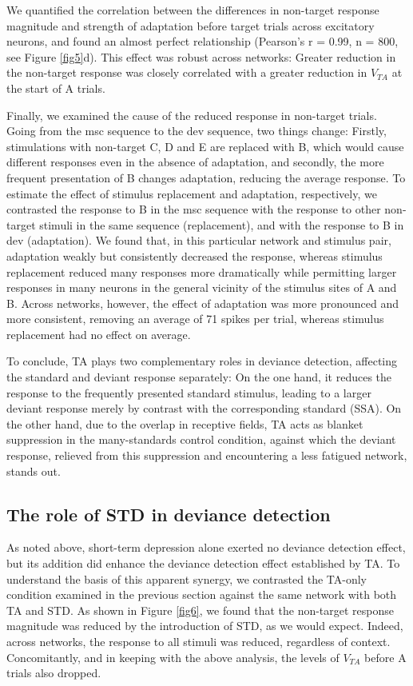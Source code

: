 \documentclass[pdflatex,referee,iicol,sn-basic]{sn-jnl}
\theoremstyle{thmstyleone}%
\theoremstyle{thmstyletwo}%
\theoremstyle{thmstylethree}%
\begin{document}
We quantified the correlation between the differences in non-target response magnitude and strength of adaptation before target trials across excitatory neurons, and found an almost perfect relationship (Pearson's r = 0.99, n = 800, see Figure \ref{fig5}d). This effect was robust across networks: Greater reduction in the non-target response was closely correlated with a greater reduction in $V_{TA}$ at the start of A trials.

Finally, we examined the cause of the reduced response in non-target trials. Going from the msc sequence to the dev sequence, two things change: Firstly, stimulations with non-target C, D and E are replaced with B, which would cause different responses even in the absence of adaptation, and secondly, the more frequent presentation of B changes adaptation, reducing the average response. To estimate the effect of stimulus replacement and adaptation, respectively, we contrasted the response to B in the msc sequence with the response to other non-target stimuli in the same sequence (replacement), and with the response to B in dev (adaptation). We found that, in this particular network and stimulus pair, adaptation weakly but consistently decreased the response, whereas stimulus replacement reduced many responses more dramatically while permitting larger responses in many neurons in the general vicinity of the stimulus sites of A and B. Across networks, however, the effect of adaptation was more pronounced and more consistent, removing an average of 71 spikes per trial, whereas stimulus replacement had no effect on average.

To conclude, TA plays two complementary roles in deviance detection, affecting the standard and deviant response separately: On the one hand, it reduces the response to the frequently presented standard stimulus, leading to a larger deviant response merely by contrast with the corresponding standard (SSA). On the other hand, due to the overlap in receptive fields, TA acts as blanket suppression in the many-standards control condition, against which the deviant response, relieved from this suppression and encountering a less fatigued network, stands out.

\subsection{The role of STD in deviance detection}\label{sec-std}

As noted above, short-term depression alone exerted no deviance detection effect, but its addition did enhance the deviance detection effect established by TA. To understand the basis of this apparent synergy, we contrasted the TA-only condition examined in the previous section against the same network with both TA and STD. As shown in Figure \ref{fig6}, we found that the non-target response magnitude was reduced by the introduction of STD, as we would expect. Indeed, across networks, the response to all stimuli was reduced, regardless of context. Concomitantly, and in keeping with the above analysis, the levels of $V_{TA}$ before A trials also dropped.
\end{document}

